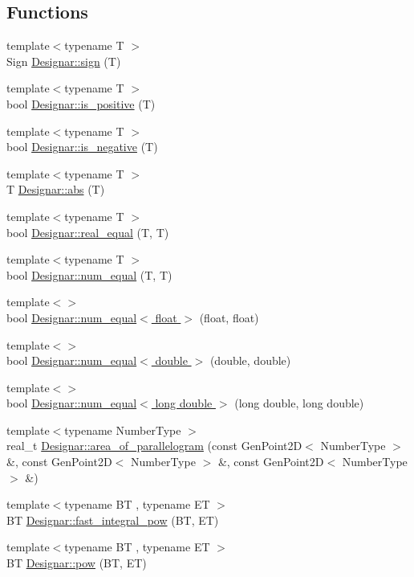 \subsection*{Functions}
\begin{DoxyCompactItemize}
\item 
{\footnotesize template$<$typename T $>$ }\\Sign \hyperlink{namespace_designar_a477673c7a4fe3e0307d96591620a0765}{Designar\+::sign} (T)
\item 
{\footnotesize template$<$typename T $>$ }\\bool \hyperlink{namespace_designar_a3b33787e014af6f2b15710970c0af068}{Designar\+::is\+\_\+positive} (T)
\item 
{\footnotesize template$<$typename T $>$ }\\bool \hyperlink{namespace_designar_afb0b402a3d6beb3873ff4408ad9ea43a}{Designar\+::is\+\_\+negative} (T)
\item 
{\footnotesize template$<$typename T $>$ }\\T \hyperlink{namespace_designar_ad1499bf1974e61fe7af9b09f5261ae57}{Designar\+::abs} (T)
\item 
{\footnotesize template$<$typename T $>$ }\\bool \hyperlink{namespace_designar_aa3e1023369fdb239670900996db45d05}{Designar\+::real\+\_\+equal} (T, T)
\item 
{\footnotesize template$<$typename T $>$ }\\bool \hyperlink{namespace_designar_ad193c81ed087e63575903c6775df36b2}{Designar\+::num\+\_\+equal} (T, T)
\item 
{\footnotesize template$<$$>$ }\\bool \hyperlink{namespace_designar_a29878d27cf434c0bac7093ec7b4d8613}{Designar\+::num\+\_\+equal$<$ float $>$} (float, float)
\item 
{\footnotesize template$<$$>$ }\\bool \hyperlink{namespace_designar_abc6408777e04d2c538830bf826901317}{Designar\+::num\+\_\+equal$<$ double $>$} (double, double)
\item 
{\footnotesize template$<$$>$ }\\bool \hyperlink{namespace_designar_a161c5a6c7e958d708e5898265c9a37f7}{Designar\+::num\+\_\+equal$<$ long double $>$} (long double, long double)
\item 
{\footnotesize template$<$typename Number\+Type $>$ }\\real\+\_\+t \hyperlink{namespace_designar_a0e768d9436448a70b1a1e2ec87b4d0ca}{Designar\+::area\+\_\+of\+\_\+parallelogram} (const Gen\+Point2D$<$ Number\+Type $>$ \&, const Gen\+Point2D$<$ Number\+Type $>$ \&, const Gen\+Point2D$<$ Number\+Type $>$ \&)
\item 
{\footnotesize template$<$typename BT , typename ET $>$ }\\BT \hyperlink{namespace_designar_a28b07c64f84f9fd04d1daa7f6e083aa2}{Designar\+::fast\+\_\+integral\+\_\+pow} (BT, ET)
\item 
{\footnotesize template$<$typename BT , typename ET $>$ }\\BT \hyperlink{namespace_designar_a94eeb5e794c32c27a0efc3e2218e9278}{Designar\+::pow} (BT, ET)
\end{DoxyCompactItemize}

